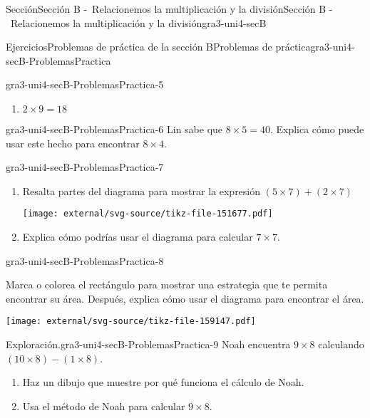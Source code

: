 \documentclass[twoside,10pt,]{article}
\begin{document}
\begin{sectionptx}{Sección}{Sección B -~Relacionemos la multiplicación y la división}{}{Sección B -~Relacionemos la multiplicación y la división}{}{}{gra3-uni4-secB}
\begin{exercises-subsection}{Ejercicios}{Problemas de práctica de la sección B}{}{Problemas de práctica}{}{}{gra3-uni4-secB-ProblemasPractica}
\begin{divisionexercise}{3}{}{}{gra3-uni4-secB-ProblemasPractica-5}
\begin{enumerate}[label=(\alph*)]
\item{}\(\displaystyle 2 \times 9 = 18\)%
\end{enumerate}
\end{divisionexercise}%
\begin{divisionexercise}{4}{}{}{gra3-uni4-secB-ProblemasPractica-6}%
Lin sabe que \(8 \times 5 = 40\). Explica cómo puede usar este hecho para encontrar \(8 \times 4\).%
\end{divisionexercise}%
\begin{divisionexercise}{5}{}{}{gra3-uni4-secB-ProblemasPractica-7}%
%
\begin{enumerate}[label=(\alph*)]
\item{}Resalta partes del diagrama para mostrar la expresión \((5 \times 7) + (2 \times 7)\)%
\begin{image}{0}{1}{0}{}%
\texttt{[image: external/svg-source/tikz-file-151677.pdf]}
\end{image}%
\item{}Explica cómo podrías usar el diagrama para calcular \(7\times 7\).%
\end{enumerate}
\end{divisionexercise}%
\begin{divisionexercise}{6}{}{}{gra3-uni4-secB-ProblemasPractica-8}%
\begin{sidebyside}{2}{0}{0}{0}%
\begin{sbspanel}{0.6}%
Marca o colorea el rectángulo para mostrar una estrategia que te permita encontrar su área. Después, explica cómo usar el diagrama para encontrar el área.%
\end{sbspanel}%
\begin{sbspanel}{0.4}%
\texttt{[image: external/svg-source/tikz-file-159147.pdf]}
\end{sbspanel}%
\end{sidebyside}%
\end{divisionexercise}%
\begin{divisionexercise}{7}{Exploración.}{}{gra3-uni4-secB-ProblemasPractica-9}%
Noah encuentra \(9 \times 8\) calculando \((10 \times 8) - (1 \times 8)\).%
%
\begin{enumerate}[label=(\alph*)]
\item{}Haz un dibujo que muestre por qué funciona el cálculo de Noah.%
\item{}Usa el método de Noah para calcular \(9\times 8\).%
\end{enumerate}
\end{divisionexercise}%

\end{exercises-subsection}
\end{sectionptx}
\end{document}
